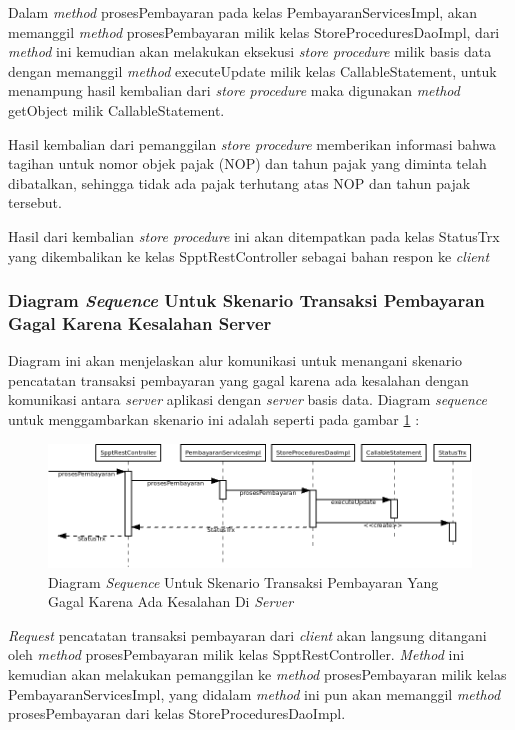 \documentclass[pdftex,12pt, oneside]{article}
\begin{document}
Dalam \textit{method} prosesPembayaran pada kelas PembayaranServicesImpl, akan memanggil \textit{method} prosesPembayaran milik kelas StoreProceduresDaoImpl, dari \textit{method} ini kemudian akan melakukan eksekusi \textit{store procedure} milik basis data dengan memanggil \textit{method} executeUpdate milik kelas CallableStatement, untuk menampung hasil kembalian dari \textit{store procedure} maka digunakan \textit{method} getObject milik CallableStatement.

Hasil kembalian dari pemanggilan \textit{store procedure} memberikan informasi bahwa tagihan untuk nomor objek pajak (NOP) dan tahun pajak yang diminta telah dibatalkan, sehingga tidak ada pajak terhutang atas NOP dan tahun pajak tersebut.

Hasil dari kembalian \textit{store procedure} ini akan ditempatkan pada kelas StatusTrx yang dikembalikan ke kelas SpptRestController sebagai bahan respon ke \textit{client}

\subsubsection{Diagram \textit{Sequence} Untuk Skenario Transaksi Pembayaran Gagal Karena Kesalahan Server}

Diagram ini akan menjelaskan alur komunikasi untuk menangani skenario pencatatan transaksi pembayaran yang gagal karena ada kesalahan dengan komunikasi antara \textit{server} aplikasi dengan \textit{server} basis data. Diagram \textit{sequence} untuk menggambarkan skenario ini adalah seperti pada gambar \ref{fig:uml-seq-trx-db-error} :

\begin{figure}[H]
  \centering
  \includegraphics[width=1\textwidth]{./resources/uml/uml-seq-trx-db-error}
  \caption{Diagram \textit{Sequence} Untuk Skenario Transaksi Pembayaran Yang Gagal Karena Ada Kesalahan Di \textit{Server}}
  \label{fig:uml-seq-trx-db-error}
\end{figure}

\textit{Request} pencatatan transaksi pembayaran dari \textit{client} akan langsung ditangani oleh \textit{method} prosesPembayaran milik kelas SpptRestController. \textit{Method} ini kemudian akan melakukan pemanggilan ke \textit{method} prosesPembayaran milik kelas PembayaranServicesImpl, yang didalam \textit{method} ini pun akan memanggil \textit{method} prosesPembayaran dari kelas StoreProceduresDaoImpl.
\end{document}
